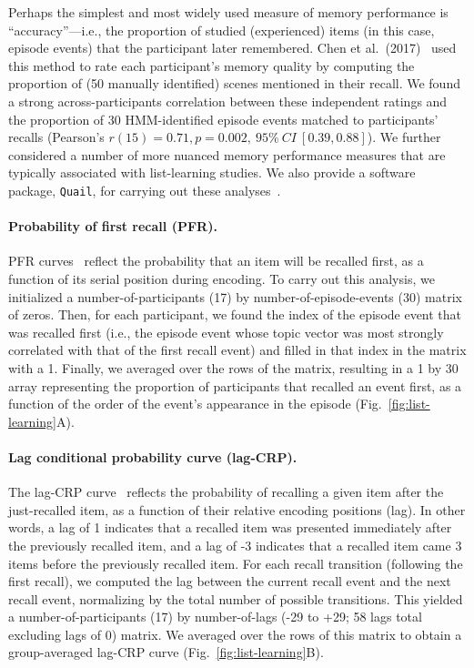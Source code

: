 \documentclass[10pt]{article}
\begin{document}
Perhaps the simplest and most widely used measure of memory performance is ``accuracy''---i.e., the proportion of studied (experienced) items (in this case, episode events) that the participant later remembered.  Chen et al.~(2017)~\cite{ChenEtal17} used this method to rate each participant's memory quality by computing the proportion of (50 manually identified) scenes mentioned in their recall.  We found a strong across-participants correlation between these independent ratings and the proportion of 30 HMM-identified episode events matched to participants' recalls (Pearson's $r(15) = 0.71, p = 0.002,~95\%~CI~[0.39, 0.88]$).  We further considered a number of more nuanced memory performance measures that are typically associated with list-learning studies.  We also provide a software package, \texttt{Quail}, for carrying out these analyses~\citep{HeusEtal17b}.

\paragraph{Probability of first recall (PFR).}  PFR curves~\citep{WelcBurn24, PostPhil65, AtkiShif68} reflect the probability that an item will be recalled first, as a function of its serial position during encoding. To carry out this analysis, we initialized a number-of-participants (17) by number-of-episode-events (30) matrix of zeros. Then, for each participant, we found the index of the episode event that was recalled first (i.e., the episode event whose topic vector was most strongly correlated with that of the first recall event) and filled in that index in the matrix with a 1.  Finally, we averaged over the rows of the matrix, resulting in a 1 by 30 array representing the proportion of participants that recalled an event first, as a function of the order of the event's appearance in the episode (Fig.~\ref{fig:list-learning}A).

\paragraph{Lag conditional probability curve (lag-CRP).} The lag-CRP curve~\citep{Kaha96} reflects the probability of recalling a given item after the just-recalled item, as a function of their relative encoding positions (lag).  In other words, a lag of 1 indicates that a recalled item was presented immediately after the previously recalled item, and a lag of -3 indicates that a recalled item came 3 items before the previously recalled item.  For each recall transition (following the first recall), we computed the lag between the current recall event and the next recall event, normalizing by the total number of possible transitions.  This yielded a number-of-participants (17) by number-of-lags (-29 to +29; 58 lags total excluding lags of 0) matrix. We averaged over the rows of this matrix to obtain a group-averaged lag-CRP curve (Fig.~\ref{fig:list-learning}B).
\end{document}

